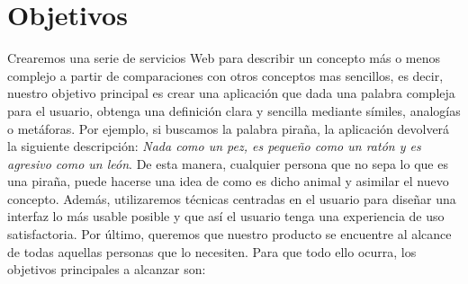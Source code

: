 \section{Objetivos}
\label{cap:sec:objetivos}
Crearemos una serie de servicios Web para describir un concepto más o menos complejo a partir de comparaciones con otros conceptos mas sencillos, es decir, nuestro objetivo principal es crear una aplicación que dada una palabra compleja para el usuario, obtenga una definición clara y sencilla mediante símiles, analogías o metáforas. 
Por ejemplo, si buscamos la palabra piraña, la aplicación devolverá la siguiente descripción:  \textit{Nada como un pez, es pequeño como un ratón y es agresivo como un león}. De esta manera, cualquier persona que no sepa lo que es una piraña, puede hacerse una idea de como es dicho animal y asimilar el nuevo concepto. Además, utilizaremos técnicas centradas en el usuario para diseñar una interfaz lo más usable posible y que así el usuario tenga una experiencia de uso satisfactoria. Por último, queremos que nuestro producto se encuentre al alcance de todas aquellas personas que lo necesiten.
 Para que todo ello ocurra, los objetivos principales a alcanzar son:
